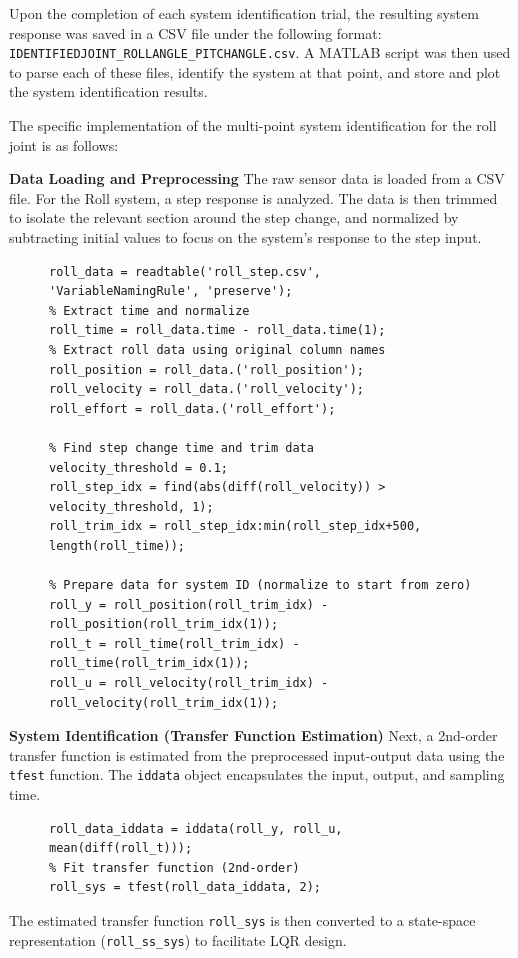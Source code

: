 Upon the completion of each system identification trial, the resulting system response was saved in a CSV file under the following format: \texttt{IDENTIFIEDJOINT\_ROLLANGLE\_PITCHANGLE.csv}. A MATLAB script was then used to parse each of these files, identify the system at that point, and store and plot the system identification results.

The specific implementation of the multi-point system identification for the roll joint is as follows:

\textbf{Data Loading and Preprocessing}
The raw sensor data is loaded from a CSV file. For the Roll system, a step response is analyzed. The data is then trimmed to isolate the relevant section around the step change, and normalized by subtracting initial values to focus on the system's response to the step input.

\begin{figure}[h!]
\centering
\begin{lstlisting}[caption={Roll Data Loading and Preprocessing}, label={lst:roll_data_prep}]
% Read CSV file with preserved headers
roll_data = readtable('roll_step.csv', 'VariableNamingRule', 'preserve');
% Extract time and normalize
roll_time = roll_data.time - roll_data.time(1);
% Extract roll data using original column names
roll_position = roll_data.('roll_position');
roll_velocity = roll_data.('roll_velocity');
roll_effort = roll_data.('roll_effort');

% Find step change time and trim data
velocity_threshold = 0.1;
roll_step_idx = find(abs(diff(roll_velocity)) > velocity_threshold, 1);
roll_trim_idx = roll_step_idx:min(roll_step_idx+500, length(roll_time));

% Prepare data for system ID (normalize to start from zero)
roll_y = roll_position(roll_trim_idx) - roll_position(roll_trim_idx(1));
roll_t = roll_time(roll_trim_idx) - roll_time(roll_trim_idx(1));
roll_u = roll_velocity(roll_trim_idx) - roll_velocity(roll_trim_idx(1));
\end{lstlisting}
\end{figure}

\textbf{System Identification (Transfer Function Estimation)}
Next, a 2nd-order transfer function is estimated from the preprocessed input-output data using the \texttt{tfest} function. The \texttt{iddata} object encapsulates the input, output, and sampling time.

\begin{figure}[h!]
\centering
\begin{lstlisting}[caption={Roll Transfer Function Estimation}, label={lst:roll_tfest}]
% Prepare data for system ID
roll_data_iddata = iddata(roll_y, roll_u, mean(diff(roll_t)));
% Fit transfer function (2nd-order)
roll_sys = tfest(roll_data_iddata, 2);
\end{lstlisting}
\end{figure}
The estimated transfer function \texttt{roll\_sys} is then converted to a state-space representation (\texttt{roll\_ss\_sys}) to facilitate LQR design.

